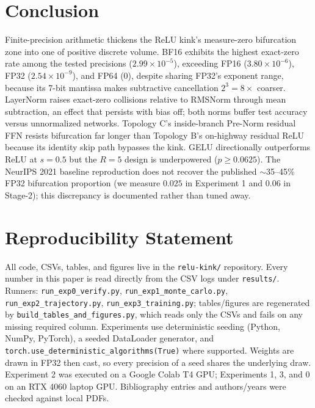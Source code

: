 \documentclass[11pt]{article}
\begin{document}
\section{Conclusion}\label{sec:conclusion}
Finite-precision arithmetic thickens the ReLU kink's measure-zero bifurcation zone into one of positive discrete volume. BF16 exhibits the highest exact-zero rate among the tested precisions ($2.99\times10^{-5}$), exceeding FP16 ($3.80\times10^{-6}$), FP32 ($2.54\times10^{-9}$), and FP64 ($0$), despite sharing FP32's exponent range, because its 7-bit mantissa makes subtractive cancellation $2^3=8\times$ coarser. LayerNorm raises exact-zero collisions relative to RMSNorm through mean subtraction, an effect that persists with bias off; both norms buffer test accuracy versus unnormalized networks. Topology C's inside-branch Pre-Norm residual FFN resists bifurcation far longer than Topology B's on-highway residual ReLU because its identity skip path bypasses the kink. GELU directionally outperforms ReLU at $s=0.5$ but the $R=5$ design is underpowered ($p\ge0.0625$). The NeurIPS 2021 baseline reproduction does not recover the published $\sim$35--45\% FP32 bifurcation proportion (we measure $0.025$ in Experiment 1 and $0.06$ in Stage-2); this discrepancy is documented rather than tuned away.

\section{Reproducibility Statement}\label{sec:reproducibility}
All code, CSVs, tables, and figures live in the \texttt{relu-kink/} repository. Every number in this paper is read directly from the CSV logs under \texttt{results/}. Runners: \texttt{run\_exp0\_verify.py}, \texttt{run\_exp1\_monte\_carlo.py}, \texttt{run\_exp2\_trajectory.py}, \texttt{run\_exp3\_training.py}; tables/figures are regenerated by \texttt{build\_tables\_and\_figures.py}, which reads only the CSVs and fails on any missing required column. Experiments use deterministic seeding (Python, NumPy, PyTorch), a seeded DataLoader generator, and \texttt{torch.use\_deterministic\_algorithms(True)} where supported. Weights are drawn in FP32 then cast, so every precision of a seed shares the underlying draw. Experiment 2 was executed on a Google Colab T4 GPU; Experiments 1, 3, and 0 on an RTX 4060 laptop GPU. Bibliography entries and authors/years were checked against local PDFs.



\end{document}
